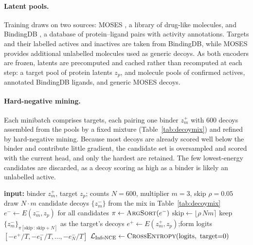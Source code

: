 \documentclass[10pt]{article}
\newcommand{\nDecoys}{600}\newcommand{\miningMult}{3}\newcommand{\skipFrac}{5\%}
\begin{document}
\paragraph{Latent pools.}
Training draws on two sources: MOSES \citep{polykovskiy2020moses}, a library of
drug-like molecules, and BindingDB \citep{gilson2016bindingdb}, a database of
protein--ligand pairs with activity annotations. Targets and their labelled
actives and inactives are taken from BindingDB, while MOSES provides additional
unlabelled molecules used as generic decoys. As both encoders are frozen, latents
are precomputed and cached rather than recomputed at each step: a target pool of
protein latents $z_p$, and molecule pools of confirmed actives, annotated
BindingDB ligands, and generic MOSES decoys.

\paragraph{Hard-negative mining.}
Each minibatch comprises \ebmBatch{} targets, each pairing one binder $z_m^{+}$
with \nDecoys{} decoys assembled from the pools by a fixed mixture
(Table~\ref{tab:decoymix}) and refined by hard-negative mining. Because most decoys
are already scored well below the binder and contribute little gradient, the
candidate set is oversampled and scored with the current head, and only the hardest
are retained. The few lowest-energy candidates are discarded, as a decoy scoring as
high as a binder is likely an unlabelled active.

\begin{algorithm}[t]
\caption{Hard-negative mining (per target)}
\label{alg:hardneg}
\begin{algorithmic}[1]
\State \textbf{input:} binder $z_m^{+}$, target $z_p$; counts $N{=}\nDecoys$, multiplier $m{=}\miningMult$, skip $\rho{=}0.05$
\State draw $N\!\cdot\!m$ candidate decoys $\{z_m^{-}\}$ from the mix in Table~\ref{tab:decoymix}
\State $e^{-} \gets E(z_m^{-}, z_p)$ for all candidates 
\State $\pi \gets \textsc{ArgSort}(e^{-})$ 
\State $\text{skip} \gets \lfloor \rho\,N m \rceil$ 
\State keep $\{z_m^{-}\}_{\pi[\text{skip}\,:\,\text{skip}+N]}$ as the target's decoys
\State $e^{+} \gets E(z_m^{+}, z_p)$;\quad form logits $[-e^{+}/T, -e^{-}_1/T, \ldots, -e^{-}_N/T]$
\State $\mathcal{L}_{\text{InfoNCE}} \gets \textsc{CrossEntropy}(\text{logits},\ \text{target}{=}0)$ 
\end{algorithmic}
\end{algorithm}
\end{document}
